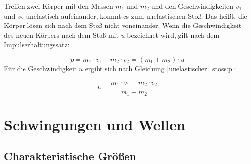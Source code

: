 \documentclass[a4paper]{article}
\begin{document}
				Treffen zwei Körper mit den Massen $m_1$ und $m_2$ und den Geschwindigkeiten $v_1$ und $v_2$ unelastisch aufeinander, kommt es zum unelastischen Stoß. Das heißt, die Körper lösen sich nach dem Stoß nicht voneinander. Wenn die Geschwindigkeit des neuen Körpers nach dem Stoß mit $u$ bezeichnet wird, gilt nach dem Impulserhaltungssatz:
				
				\begin{equation}\label{unelastischer_stoss:p}
					p=m_1 \cdot v_1 + m_2 \cdot v_2 = (m_1 + m_2) \cdot u
				\end{equation}
				Für die Geschwindigkeit $u$ ergibt sich nach Gleichung \ref{unelastischer_stoss:p}:
				
				\begin{equation}
					u=\frac{m_1 \cdot v_1 + m_2 \cdot v_2}{m_1 + m_2}
				\end{equation}
			
			
	\section{Schwingungen und Wellen}			
		\subsection{Charakteristische Größen}
\end{document}
